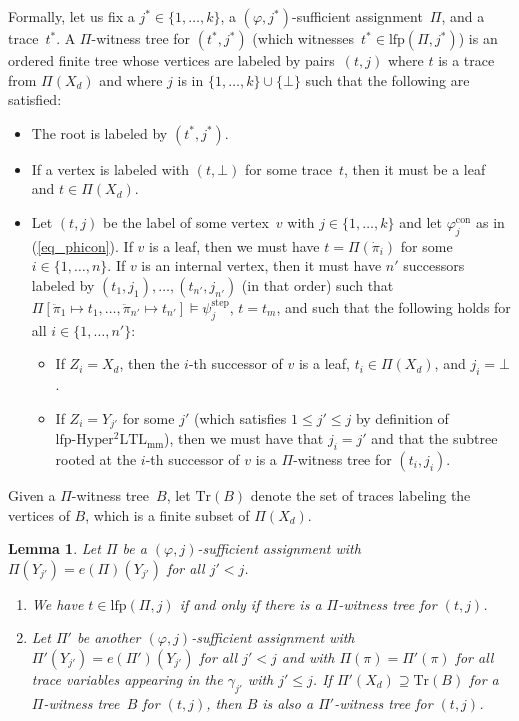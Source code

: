 \documentclass[dvipsnames,10pt,a4paper]{amsart}
\newtheorem{lem}[thm]{Lemma}
\theoremstyle{definition}
\theoremstyle{remark}
\renewcommand{\phi}{\varphi}
\newcommand{\set}[1]{\{#1\}}
\newcommand{\lfpsohyltlfp}{\mathrm{lfp\text{-}{Hyper^2LTL_{\mathrm{mm}}}}\xspace}
\newcommand{\unidisvar}{X_d}
\newcommand{\traces}{\mathrm{Tr}}
\newcommand{\con}{\mathrm{con}}
\newcommand{\step}{\mathrm{step}}
\newcommand{\overdot}[1]{\dot{#1}}
\newcommand{\overdotdot}[1]{\ddot{#1}}
\newcommand{\lfp}{\mathrm{lfp}}
\newcommand{\tree}{B}
\newcommand{\itereval}{e}
\begin{document}
Formally, let us fix a $j^* \in \set{1,\ldots,k}$, a $(\phi,j^*)$-sufficient assignment~$\Pi$, and a trace~$t^*$. 
A $\Pi$-witness tree for $(t^*,j^*)$ (which witnesses~$t^* \in\lfp(\Pi,j^*)$) is an ordered finite tree whose vertices are labeled by pairs~$(t,j)$ where $t$ is a trace from $\Pi(\unidisvar)$ and where $j $ is in $\set{1,\ldots, k} \cup \set{\bot}$ such that the following are satisfied:
\begin{itemize}
    \item The root is labeled by $(t^*, j^*)$.
        \item If a vertex is labeled with $(t,\bot)$ for some trace~$t$, then it must be a leaf and $t \in \Pi(\unidisvar)$.
        
        \item Let $(t,j)$ be the label of some vertex~$v$ with $j\in\set{1,\ldots,k}$ and let $\phi_j^\con$ as in (\ref{eq_phicon}).
If $v$ is a leaf, then we must have $t = \Pi(\overdot{\pi}_i)$ for some $i \in \set{1, \ldots, n}$.
If $v$ is an internal vertex, then it must have $n'$ successors labeled by $(t_1,j_1),\ldots,(t_{n'},j_{n'})$ (in that order) such that $\Pi[\overdotdot{\pi}_1 \mapsto t_1, \ldots, \overdotdot{\pi}_{n'} \mapsto t_{n'}] \models \psi^\step_j $, $t = t_m$, and
such that the following holds for all $i \in \set{1, \ldots, n'}$:
\begin{itemize}
    \item If $Z_i = \unidisvar$, then the $i$-th successor of $v$ is a leaf, $t_i \in \Pi(\unidisvar)$, and $j_i = \bot$.
    \item If $Z_i = Y_{j'}$ for some $j'$ (which satisfies $1 \le j' \le j$ by definition of $\lfpsohyltlfp$), then we must have that $ j_i = j'$ and that the subtree rooted at the $i$-th successor of $v$ is a $\Pi$-witness tree for $(t_i,j_i)$.
\end{itemize}
\end{itemize}

Given a $\Pi$-witness tree~$\tree$, let $\traces(\tree)$ denote the set of traces labeling the vertices of $\tree$, which is a finite subset of $\Pi(\unidisvar)$.

\begin{lem}
\label{lemma:witnesstreeprops}
Let $\Pi$ be a $(\phi,j)$-sufficient assignment with $\Pi(Y_{j'}) = \itereval(\Pi)(Y_{j'})$ for all $j' < j$.
\begin{enumerate}
    \item \label{lemma:witnesstreeprops_correctness}
    We have $t \in \lfp(\Pi, j)$ if and only if there is a $\Pi$-witness tree for $(t,j)$.

    \item\label{lemma:witnesstreeprops_restr}
    Let $\Pi'$ be another $(\phi, j)$-sufficient assignment with $\Pi'(Y_{j'}) = \itereval(\Pi')(Y_{j'})$ for all $j' < j$ and with $\Pi(\pi) = \Pi'(\pi)$ for all trace variables appearing in the $\gamma_{j'}$ with $j' \le j$.
    If $\Pi'(\unidisvar) \supseteq \traces(\tree)$ for a $\Pi$-witness tree~$\tree$ for $(t,j)$,
    then $\tree$ is also a $\Pi'$-witness tree for $(t,j)$.

\end{enumerate}
\end{lem}
\end{document}
